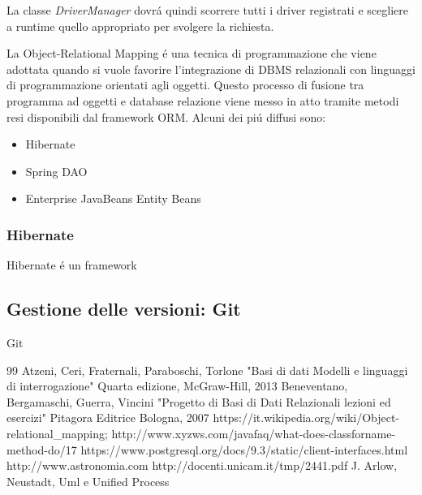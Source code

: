 \documentclass[12pt,a4paper,onecolumn,x11names]{article}
\begin{document}
				\begin{flushleft}
					La classe \textit{DriverManager} dovr\'{a} quindi scorrere tutti i driver registrati e scegliere a runtime quello appropriato per svolgere la richiesta.\newline
					
						La Object-Relational Mapping \'{e} una tecnica di programmazione che viene adottata quando si vuole favorire l'integrazione di DBMS relazionali con linguaggi di programmazione orientati agli oggetti. Questo processo di fusione tra programma ad oggetti e database relazione viene messo in atto tramite metodi resi disponibili dal framework ORM. Alcuni dei pi\'{u} diffusi sono:
						
						\begin{itemize}
							\item Hibernate
							\item Spring DAO
							\item Enterprise JavaBeans Entity Beans
						\end{itemize}		
				\end{flushleft}
		
		
			\subsubsection{Hibernate}
				\begin{flushleft}
					Hibernate \'{e} un framework
				\end{flushleft}
	\newpage

	\subsection{Gestione delle versioni: Git}
		\begin{flushleft}
			Git
		\end{flushleft}



\newpage
\renewcommand\refname{Bibliografia}
\begin{thebibliography} {99}
	 Atzeni, Ceri, Fraternali, Paraboschi, Torlone
	"Basi di dati Modelli e linguaggi di interrogazione"
	Quarta edizione, McGraw-Hill, 2013
	 Beneventano, Bergamaschi, Guerra, Vincini "Progetto di Basi di Dati Relazionali lezioni ed esercizi"
	Pitagora Editrice Bologna, 2007
	 https://it.wikipedia.org/wiki/Object-relational\_mapping;
	 http://www.xyzws.com/javafaq/what-does-classforname-method-do/17
	 https://www.postgresql.org/docs/9.3/static/client-interfaces.html
	http://www.astronomia.com
	http://docenti.unicam.it/tmp/2441.pdf
	 J. Arlow, Neustadt, Uml e Unified Process
\end{thebibliography}
\end{document}
